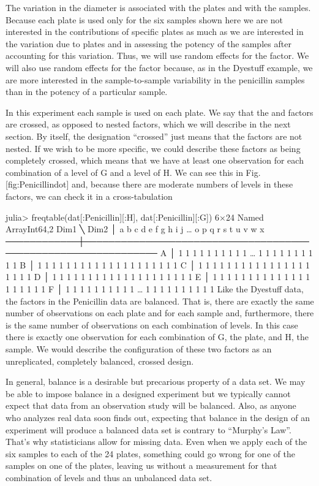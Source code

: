 The variation in the diameter is associated with the plates and with the samples. Because each plate is used only for the six samples shown here we are not interested in the contributions of specific plates as much as we are interested in the variation due to plates and in assessing the potency of the samples after accounting for this variation. Thus, we will use random effects for the factor. We will also use random effects for the factor because, as in the Dyestuff example, we are more interested in the sample-to-sample variability in the penicillin samples than in the potency of a particular sample.

In this experiment each sample is used on each plate. We say that the and factors are crossed, as opposed to nested factors, which we will describe in the next section. By itself, the designation “crossed” just means that the factors are not nested. If we wish to be more specific, we could describe these factors as being completely crossed, which means that we have at least one observation for each combination of a level of G and a level of H. We can see this in Fig. [fig:Penicillindot] and, because there are moderate numbers of levels in these factors, we can check it in a cross-tabulation

julia> freqtable(dat[:Penicillin][:H], dat[:Penicillin][:G])
6×24 Named Array{Int64,2}
Dim1 ╲ Dim2 │ a  b  c  d  e  f  g  h  i  j  …  o  p  q  r  s  t  u  v  w  x
────────────┼──────────────────────────────────────────────────────────────
A           │ 1  1  1  1  1  1  1  1  1  1  …  1  1  1  1  1  1  1  1  1  1
B           │ 1  1  1  1  1  1  1  1  1  1     1  1  1  1  1  1  1  1  1  1
C           │ 1  1  1  1  1  1  1  1  1  1     1  1  1  1  1  1  1  1  1  1
D           │ 1  1  1  1  1  1  1  1  1  1     1  1  1  1  1  1  1  1  1  1
E           │ 1  1  1  1  1  1  1  1  1  1     1  1  1  1  1  1  1  1  1  1
F           │ 1  1  1  1  1  1  1  1  1  1  …  1  1  1  1  1  1  1  1  1  1
Like the Dyestuff data, the factors in the Penicillin data are balanced. That is, there are exactly the same number of observations on each plate and for each sample and, furthermore, there is the same number of observations on each combination of levels. In this case there is exactly one observation for each combination of G, the plate, and H, the sample. We would describe the configuration of these two factors as an unreplicated, completely balanced, crossed design.

In general, balance is a desirable but precarious property of a data set. We may be able to impose balance in a designed experiment but we typically cannot expect that data from an observation study will be balanced. Also, as anyone who analyzes real data soon finds out, expecting that balance in the design of an experiment will produce a balanced data set is contrary to “Murphy’s Law”. That’s why statisticians allow for missing data. Even when we apply each of the six samples to each of the 24 plates, something could go wrong for one of the samples on one of the plates, leaving us without a measurement for that combination of levels and thus an unbalanced data set.

